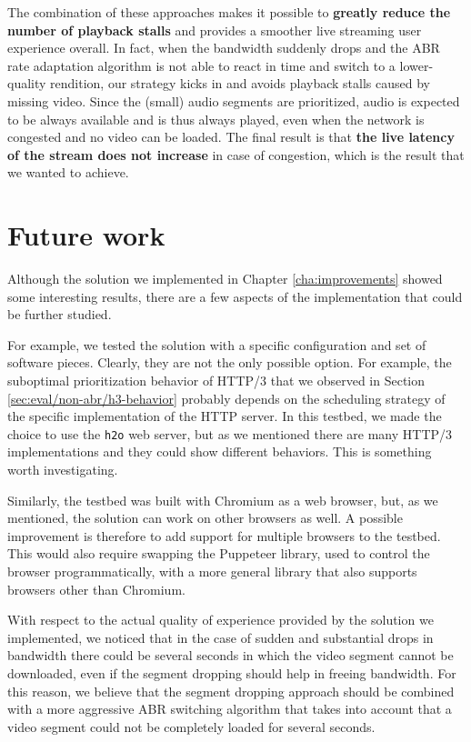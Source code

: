 The combination of these approaches makes it possible to \textbf{greatly reduce the number of playback stalls} and provides a smoother live streaming user experience overall. In fact, when the bandwidth suddenly drops and the ABR rate adaptation algorithm is not able to react in time and switch to a lower-quality rendition, our strategy kicks in and avoids playback stalls caused by missing video. Since the (small) audio segments are prioritized, audio is expected to be always available and is thus always played, even when the network is congested and no video can be loaded. The final result is that \textbf{the live latency of the stream does not increase} in case of congestion, which is the result that we wanted to achieve.

\section{Future work}
\label{sec:conclusions/future}

Although the solution we implemented in Chapter \ref{cha:improvements} showed some interesting results, there are a few aspects of the implementation that could be further studied.

For example, we tested the solution with a specific configuration and set of software pieces. Clearly, they are not the only possible option. For example, the suboptimal prioritization behavior of HTTP/3 that we observed in Section \ref{sec:eval/non-abr/h3-behavior} probably depends on the scheduling strategy of the specific implementation of the HTTP server. In this testbed, we made the choice to use the \texttt{h2o} web server, but as we mentioned there are many HTTP/3 implementations and they could show different behaviors. This is something worth investigating.

Similarly, the testbed was built with Chromium as a web browser, but, as we mentioned, the solution can work on other browsers as well. A possible improvement is therefore to add support for multiple browsers to the testbed. This would also require swapping the Puppeteer library, used to control the browser programmatically, with a more general library that also supports browsers other than Chromium.

With respect to the actual quality of experience provided by the solution we implemented, we noticed that in the case of sudden and substantial drops in bandwidth there could be several seconds in which the video segment cannot be downloaded, even if the segment dropping should help in freeing bandwidth. For this reason, we believe that the segment dropping approach should be combined with a more aggressive ABR switching algorithm that takes into account that a video segment could not be completely loaded for several seconds.


